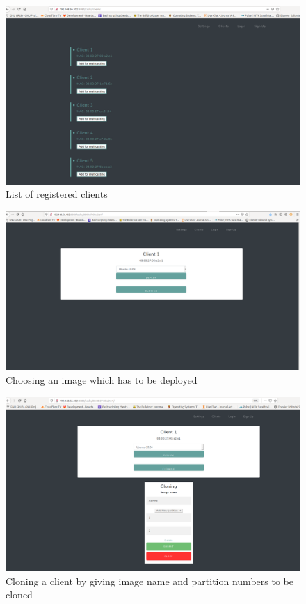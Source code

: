 \documentclass[a4paper,12pt]{article}
\begin{document}
\begin{figure}
    \centering
    \includegraphics[width=\linewidth]{clientslist.png}
    \caption{List of registered clients}
    \label{reg_clients}
\end{figure}
\begin{figure}
    \centering
    \includegraphics[width=\linewidth]{Deployment.png}
    \caption{Choosing an image which has to be deployed}
    \label{task_image_deploy}
\end{figure}
\begin{figure}
    \centering
    \includegraphics[width=\linewidth]{Cloning_2.png}
    \caption{Cloning a client by giving image name and partition numbers to be cloned}
    \label{cloning}
\end{figure}
\end{document}
